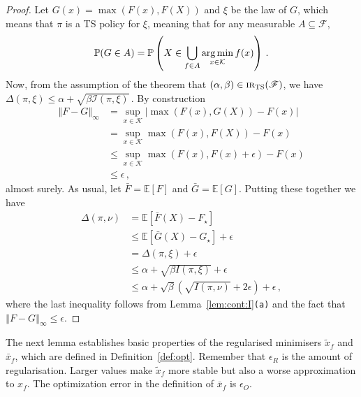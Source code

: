 \documentclass[letter, 12pt]{report}
\newcommand{\epsR}{{\epsilon_R}}
\newcommand{\epsO}{{\epsilon_O}}
\newcommand{\argmin}{\operatornamewithlimits{arg\,min}}
\newcommand{\norm}[1]{\left \Vert  #1 \right \Vert}
\newcommand{\E}{\mathbb E}
\newcommand{\cK}{\mathcal K}
\newcommand{\cF}{\mathcal F}
\newcommand{\sF}{\mathscr F}
\newcommand{\cI}{\mathcal I}
\newcommand{\1}{\mathbf{1}}
\newcommand{\mP}{\mathbb{P}}
\newcommand{\IR}{\operatorname{\textsc{ir}}}
\newcommand{\ts}{\textsc{TS}\xspace}
\theoremstyle{plain}
\theoremstyle{definition}
\theoremstyle{remark}
\begin{document}
\begin{proof}
    Let $G(x) = \max(F(x), F(X))$ and $\xi$ be the law of $G$, which means that $\pi$ is a \ts{} policy for $\xi$, meaning that for any measurable $A \subseteq \cF$,
    \begin{align*}
        \mP(G \in A) = \mP\left(X \in \bigcup_{f \in A} \argmin_{x \in \cK} f(x)\right)\,.
    \end{align*}
    Now, from the assumption of the theorem that $(\alpha, \beta) \in \IR_\ts(\sF)$, we have
    $\Delta(\pi, \xi) \leq \alpha + \sqrt{\beta \cI(\pi, \xi)}$\,.
    By construction
    \begin{align*}
        \norm{F - G}_\infty
         & =
        \sup_{x \in \cK} |\max(F(x), G(X)) - F(x)|          \\
         & =
        \sup_{x \in \cK} \max(F(x), F(X)) - F(x)            \\
         & \leq
        \sup_{x \in \cK} \max(F(x), F(x) + \epsilon) - F(x) \\
         & \leq \epsilon\,,
    \end{align*}
    almost surely.
    As usual, let $\bar F = \E[F]$ and $\bar G = \E[G]$.
    Putting these together we have
    \begin{align*}
        \Delta(\pi, \nu)
         & = \E[\bar F(X) - F_\star]                                                   \\
         & \leq \E[\bar G(X) - G_\star] + \epsilon                                     \\
         & = \Delta(\pi, \xi) + \epsilon                                               \\
         & \leq \alpha + \sqrt{\beta I(\pi, \xi)} + \epsilon                           \\
         & \leq \alpha + \sqrt{\beta} (\sqrt{I(\pi, \nu)} + 2 \epsilon) + \epsilon \,,
    \end{align*}
    where the last inequality follows from Lemma~\ref{lem:cont:I}\texttt{(a)} and the fact that $\norm{F - G}_\infty \leq \epsilon$.
\end{proof}

The next lemma establishes basic properties of the regularised minimisers $\tilde x_f$ and $\bar x_f$, which are defined
in Definition~\ref{def:opt}.
Remember that $\epsR$ is the amount of regularisation. Larger values make $\tilde x_f$ more stable but also a worse approximation to $x_f$.
The optimization error in the definition of $\bar x_f$ is $\epsO$.
\end{document}
